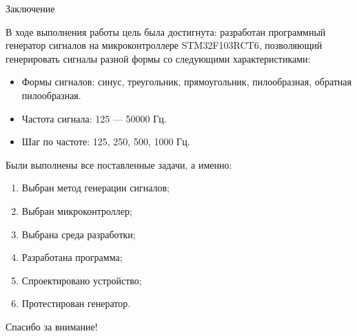 \documentclass[10pt]{beamer}
\begin{document}
\begin{frame}{Заключение}

	В ходе выполнения работы цель была достигнута: разработан программный генератор сигналов на микроконтроллере STM32F103RCT6, позволяющий генерировать сигналы разной формы со следующими характеристиками:
	\begin{itemize}
		\item Формы сигналов: синус, треугольник, прямоугольник, пилообразная, обратная пилообразная.
		\item Частота сигнала: 125 --- 50000 Гц.
		\item Шаг по частоте: 125, 250, 500, 1000 Гц.
	\end{itemize}

	Были выполнены все поставленные задачи, а именно:
	\begin{enumerate}
		\item Выбран метод генерации сигналов;
		\item Выбран микроконтроллер;
		\item Выбрана среда разработки;
		\item Разработана программа;
		\item Спроектировано устройство;
		\item Протестирован генератор.
	\end{enumerate}
	
	
	

\end{frame}

\begin{frame}
\begin{center}
{\Huge Спасибо за внимание! }
\end{center}
\end{frame}
\end{document}
